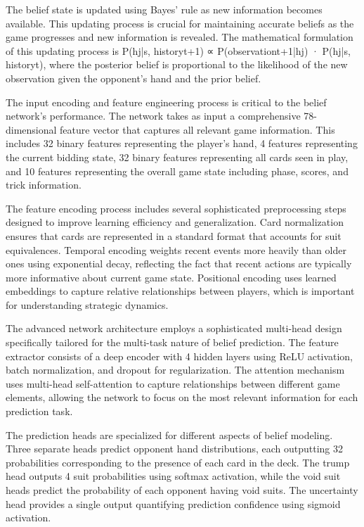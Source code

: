 \documentclass[conference]{IEEEtran}
\begin{document}
The belief state is updated using Bayes' rule as new information becomes available. This updating process is crucial for maintaining accurate beliefs as the game progresses and new information is revealed. The mathematical formulation of this updating process is P(hj|s, historyt+1) ∝ P(observationt+1|hj) · P(hj|s, historyt), where the posterior belief is proportional to the likelihood of the new observation given the opponent's hand and the prior belief.

The input encoding and feature engineering process is critical to the belief network's performance. The network takes as input a comprehensive 78-dimensional feature vector that captures all relevant game information. This includes 32 binary features representing the player's hand, 4 features representing the current bidding state, 32 binary features representing all cards seen in play, and 10 features representing the overall game state including phase, scores, and trick information.

The feature encoding process includes several sophisticated preprocessing steps designed to improve learning efficiency and generalization. Card normalization ensures that cards are represented in a standard format that accounts for suit equivalences. Temporal encoding weights recent events more heavily than older ones using exponential decay, reflecting the fact that recent actions are typically more informative about current game state. Positional encoding uses learned embeddings to capture relative relationships between players, which is important for understanding strategic dynamics.

The advanced network architecture employs a sophisticated multi-head design specifically tailored for the multi-task nature of belief prediction. The feature extractor consists of a deep encoder with 4 hidden layers using ReLU activation, batch normalization, and dropout for regularization. The attention mechanism uses multi-head self-attention to capture relationships between different game elements, allowing the network to focus on the most relevant information for each prediction task.

The prediction heads are specialized for different aspects of belief modeling. Three separate heads predict opponent hand distributions, each outputting 32 probabilities corresponding to the presence of each card in the deck. The trump head outputs 4 suit probabilities using softmax activation, while the void suit heads predict the probability of each opponent having void suits. The uncertainty head provides a single output quantifying prediction confidence using sigmoid activation.
\end{document}
